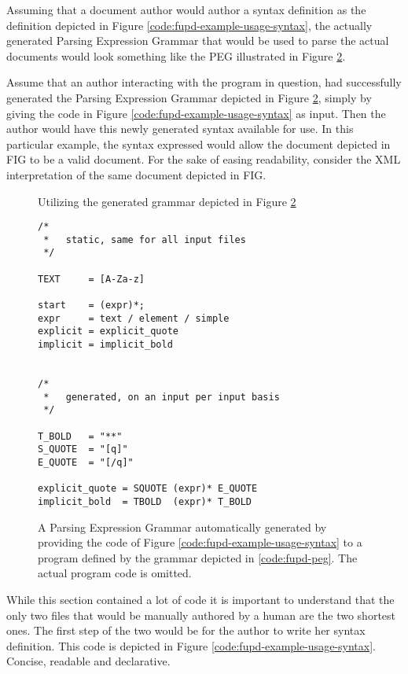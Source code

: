 \documentclass{scrreprt}
\begin{document}
Assuming that a document author would author a syntax definition as the definition depicted in Figure \ref{code:fupd-example-usage-syntax}, the actually generated Parsing Expression Grammar that would be used to parse the actual documents would look something like the PEG illustrated in Figure \ref{code:fupd-example-generated-peg}.


Assume that an author interacting with the program in question, had successfully generated the Parsing Expression Grammar depicted in Figure \ref{code:fupd-example-generated-peg}, simply by giving the code in Figure \ref{code:fupd-example-usage-syntax} as input. Then the author would have this newly generated syntax available for use. In this particular example, the syntax expressed would allow the document depicted in FIG to be a valid document. For the sake of easing readability, consider the XML interpretation of the same document depicted in FIG.

\begin{figure}[h]
\centering
{}
\caption{Utilizing the generated grammar depicted in Figure \ref{code:fupd-example-generated-peg}}
\label{code:fup-example-markup}
\end{figure}



\begin{figure}[h]
\begin{lstlisting}
/*
 *   static, same for all input files
 */

TEXT     = [A-Za-z]

start    = (expr)*;
expr     = text / element / simple
explicit = explicit_quote
implicit = implicit_bold


/*
 *   generated, on an input per input basis
 */

T_BOLD   = "**"
S_QUOTE  = "[q]"
E_QUOTE  = "[/q]"

explicit_quote = SQUOTE (expr)* E_QUOTE
implicit_bold  = TBOLD  (expr)* T_BOLD
\end{lstlisting}
\caption{A Parsing Expression Grammar automatically generated by providing the code of Figure \ref{code:fupd-example-usage-syntax} to a program defined by the grammar depicted in \ref{code:fupd-peg}. The actual program code is omitted.}
\label{code:fupd-example-generated-peg}
\end{figure}



While this section contained a lot of code it is important to understand that the only two files that would be manually authored by a human are the two shortest ones. The first step of the two would be for the author to write her syntax definition. This code is depicted in Figure \ref{code:fupd-example-usage-syntax}. Concise, readable and declarative.
\end{document}
